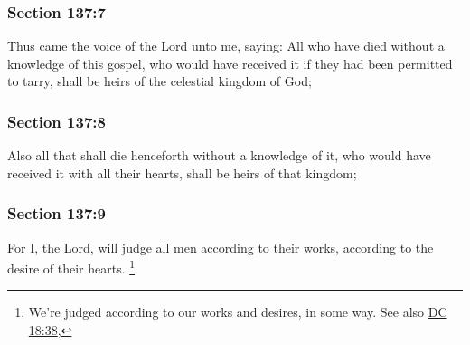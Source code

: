 	\subsubsection{Section 137:7} %
		\label{DC137-7}

		Thus came the voice of the Lord unto me, saying: All who have died without a knowledge of this gospel, who would have received it if they had been permitted to tarry, shall be heirs of the celestial kingdom of God;


	\subsubsection{Section 137:8} %
		\label{DC137-8}

		Also all that shall die henceforth without a knowledge of it, who would have received it with all their hearts, shall be heirs of that kingdom;


	\subsubsection{Section 137:9} %
		\label{DC137-9}

		For I, the Lord, will judge all men according to their works, according to the desire of their hearts.%
			\footnote{%
				We're judged according to our works and desires, in some way. See also \hyperref[DC18-38]{DC 18:38}, 
				}


